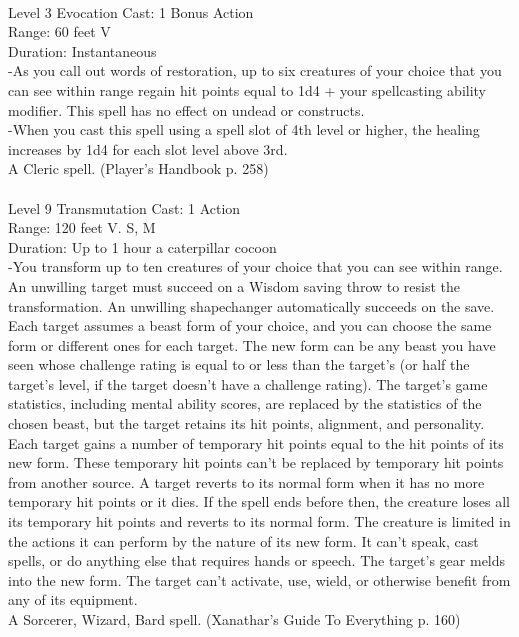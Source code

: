 \documentclass[10pt,twocolumn]{report}
\begin{document}
 \\
Level 3 \quad Evocation \quad Cast: 1 Bonus Action\\
Range: 60 feet \quad V\\
Duration: Instantaneous \quad \\
-As you call out words of restoration, up to six creatures of your choice that you can see within range regain hit points equal to 1d4 + your spellcasting ability modifier. This spell has no effect on undead or constructs.\\
-When you cast this spell using a spell slot of 4th level or higher, the healing increases by 1d4 for each slot level above 3rd.\\
A Cleric spell. (Player's Handbook p. 258) \\


 \\
Level 9 \quad Transmutation \quad Cast: 1 Action\\
Range: 120 feet \quad V. S, M\\
Duration: Up to 1 hour \quad a caterpillar cocoon\\
-You transform up to ten creatures of your choice that you can see within range. An unwilling target must succeed on a Wisdom saving throw to resist the transformation. An unwilling shapechanger automatically succeeds on the save.
Each target assumes a beast form of your choice, and you can choose the same form or different ones for each target. The new form can be any beast you have seen whose challenge rating is equal to or less than the target’s (or half the target’s level, if the target doesn’t have a challenge rating). The target’s game statistics, including mental ability scores, are replaced by the statistics of the chosen beast, but the target retains its hit points, alignment, and personality.
Each target gains a number of temporary hit points equal to the hit points of its new form. These temporary hit points can’t be replaced by temporary hit points from another source. A target reverts to its normal form when it has no more temporary hit points or it dies. If the spell ends before then, the creature loses all its temporary hit points and reverts to its normal form.
The creature is limited in the actions it can perform by the nature of its new form. It can’t speak, cast spells, or do anything else that requires hands or speech. The target’s gear melds into the new form.
The target can’t activate, use, wield, or otherwise benefit from any of its equipment.\\
A Sorcerer, Wizard, Bard spell. (Xanathar's Guide To Everything p. 160) \\
\end{document}

